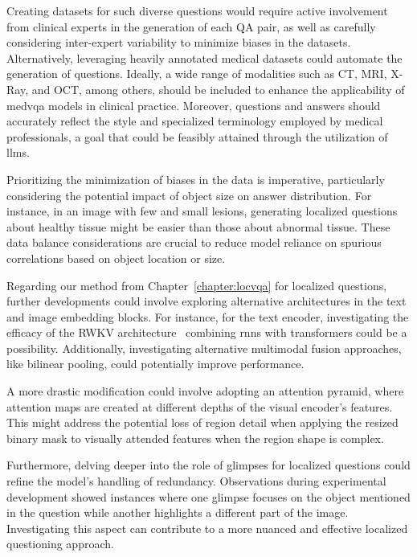 Creating datasets for such diverse questions would require active involvement from clinical experts in the generation of each QA pair, as well as carefully considering inter-expert variability to minimize biases in the datasets. Alternatively, leveraging heavily annotated medical datasets could automate the generation of questions. Ideally, a wide range of modalities such as CT, MRI, X-Ray, and OCT, among others, should be included to enhance the applicability of \gls{medvqa} models in clinical practice. Moreover, questions and answers should accurately reflect the style and specialized terminology employed by medical professionals, a goal that could be feasibly attained through the utilization of \glspl{llm}.


Prioritizing the minimization of biases in the data is imperative, particularly considering the potential impact of object size on answer distribution. For instance, in an image with few and small lesions, generating localized questions about healthy tissue might be easier than those about abnormal tissue. These data balance considerations are crucial to reduce model reliance on spurious correlations based on object location or size.

Regarding our method from Chapter~\ref{chapter:locvqa} for localized questions, further developments could involve exploring alternative architectures in the text and image embedding blocks. For instance, for the text encoder, investigating the efficacy of the RWKV architecture~\cite{peng2023rwkv} combining \glspl{rnn} with transformers could be a possibility. Additionally, investigating alternative multimodal fusion approaches, like bilinear pooling, could potentially improve performance.

A more drastic modification could involve adopting an attention pyramid, where attention maps are created at different depths of the visual encoder's features. This might address the potential loss of region detail when applying the resized binary mask to visually attended features when the region shape is complex.

Furthermore, delving deeper into the role of glimpses for localized questions could refine the model's handling of redundancy. Observations during experimental development showed instances where one glimpse focuses on the object mentioned in the question while another highlights a different part of the image. Investigating this aspect can contribute to a more nuanced and effective localized questioning approach.

